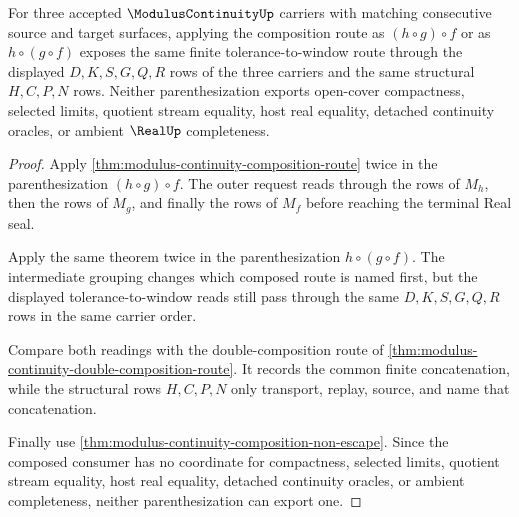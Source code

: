 \begin{theorem}
\label{thm:modulus-continuity-composition-associativity-route}
For three accepted $\ModulusContinuityUp$ carriers with matching consecutive source and target surfaces, applying the composition route as $(h \circ g) \circ f$ or as $h \circ (g \circ f)$ exposes the same finite tolerance-to-window route through the displayed $D,K,S,G,Q,R$ rows of the three carriers and the same structural $H,C,P,N$ rows. Neither parenthesization exports open-cover compactness, selected limits, quotient stream equality, host real equality, detached continuity oracles, or ambient $\RealUp$ completeness.
\end{theorem}
\begin{proof}
Apply \autoref{thm:modulus-continuity-composition-route} twice in the parenthesization $(h \circ g) \circ f$. The outer request reads through the rows of $M_h$, then the rows of $M_g$, and finally the rows of $M_f$ before reaching the terminal Real seal.

Apply the same theorem twice in the parenthesization $h \circ (g \circ f)$. The intermediate grouping changes which composed route is named first, but the displayed tolerance-to-window reads still pass through the same $D,K,S,G,Q,R$ rows in the same carrier order.

Compare both readings with the double-composition route of \autoref{thm:modulus-continuity-double-composition-route}. It records the common finite concatenation, while the structural rows $H,C,P,N$ only transport, replay, source, and name that concatenation.

Finally use \autoref{thm:modulus-continuity-composition-non-escape}. Since the composed consumer has no coordinate for compactness, selected limits, quotient stream equality, host real equality, detached continuity oracles, or ambient completeness, neither parenthesization can export one.
\end{proof}

